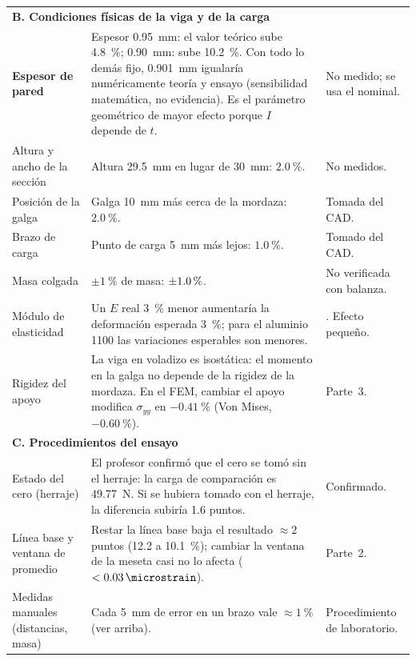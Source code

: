 \documentclass[11pt,a4paper]{article}
\begin{document}
{\begin{longtable}{p{3.4cm}p{6.9cm}p{4.2cm}}
\midrule
\multicolumn{3}{l}{\textbf{B. Condiciones f\'isicas de la viga y de la carga}}\\
\addlinespace
\textbf{Espesor de pared} & Espesor \SI{0,95}{mm}: el valor te\'orico sube \SI{4,8}{\percent}; \SI{0,90}{mm}: sube \SI{10,2}{\percent}. Con todo lo dem\'as fijo, \SI{0,901}{mm} igualar\'ia num\'ericamente teor\'ia y ensayo (sensibilidad matem\'atica, no evidencia). Es el par\'ametro geom\'etrico de mayor efecto porque $I$ depende de $t$. & No medido; se usa el nominal. \\
\addlinespace
Altura y ancho de la secci\'on & Altura \SI{29,5}{mm} en lugar de \SI{30}{mm}: $\SI{+2,0}{\percent}$. & No medidos. \\
\addlinespace
Posici\'on de la galga & Galga \SI{10}{mm} m\'as cerca de la mordaza: $\SI{+2,0}{\percent}$. & Tomada del CAD. \\
\addlinespace
Brazo de carga & Punto de carga \SI{5}{mm} m\'as lejos: $\SI{+1,0}{\percent}$. & Tomado del CAD. \\
\addlinespace
Masa colgada & $\pm\SI{1}{\percent}$ de masa: $\SI{\pm1,0}{\percent}$. & No verificada con balanza. \\
\addlinespace
M\'odulo de elasticidad & Un $E$ real \SI{3}{\percent} menor aumentar\'ia la deformaci\'on esperada \SI{3}{\percent}; para el aluminio 1100 las variaciones esperables son menores. & \cite{asm}. Efecto peque\~no. \\
\addlinespace
Rigidez del apoyo & La viga en voladizo es isost\'atica: el momento en la galga no depende de la rigidez de la mordaza. En el FEM, cambiar el apoyo modifica $\sigma_{yy}$ en $\SI{-0,41}{\percent}$ (Von Mises, $\SI{-0,60}{\percent}$). & Parte~3. \\
\midrule
\multicolumn{3}{l}{\textbf{C. Procedimientos del ensayo}}\\
\addlinespace
Estado del cero (herraje) & El profesor confirm\'o que el cero se tom\'o sin el herraje: la carga de comparaci\'on es \SI{49,77}{N}. Si se hubiera tomado con el herraje, la diferencia subir\'ia \SI{1,6}{} puntos. & Confirmado. \\
\addlinespace
L\'inea base y ventana de promedio & Restar la l\'inea base baja el resultado $\approx\SI{2}{}$ puntos (\SI{12,2}{} a \SI{10,1}{\percent}); cambiar la ventana de la meseta casi no lo afecta ($<\SI{0,03}{\microstrain}$). & Parte~2. \\
\addlinespace
Medidas manuales (distancias, masa) & Cada \SI{5}{mm} de error en un brazo vale $\approx\SI{1}{\percent}$ (ver arriba). & Procedimiento de laboratorio. \\

\end{longtable}}
\end{document}
